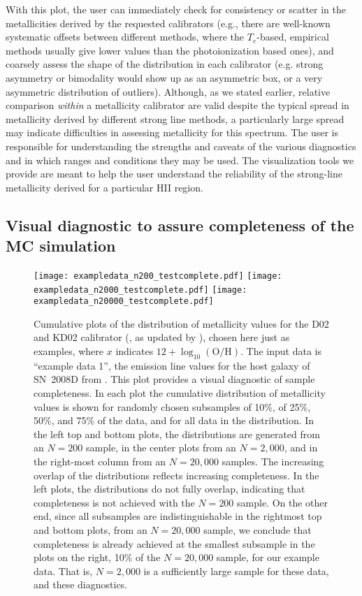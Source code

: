 \documentclass{emulateapj}
\newcommand{\oxabinline}{\ensuremath{12 + \log_{10}(\mathrm{O}/\mathrm{H})}}
\begin{document}
With this plot, the user can immediately check for consistency or
scatter in the metallicities derived by the requested calibrators
(e.g., there are well-known systematic offsets between different
methods, where the $T_e$-based, empirical methods usually give lower
values than the photoionization based ones), and coarsely assess the
shape of the distribution in each calibrator (e.g. strong asymmetry or
bimodality would show up as an asymmetric box, or a very asymmetric
distribution of outliers). Although, as we stated earlier, relative
comparison \emph{within} a metallicity calibrator are valid despite
the typical spread in metallicity derived by different strong line
methods, a particularly large spread may indicate difficulties in
assessing metallicity for this spectrum. The user is responsible for
understanding the strengths and caveats of the various diagnostics and
in which ranges and conditions they may be used. The visualization
tools we provide are meant to help the user understand the reliability
of the strong-line metallicity derived for a particular HII region.


\subsection{Visual diagnostic to assure completeness of the MC simulation}\label{sec:completeness}

\begin{figure*}[!ht]
\centerline{
  \texttt{[image: exampledata\_n200\_testcomplete.pdf]}
  \texttt{[image: exampledata\_n2000\_testcomplete.pdf]}
  \texttt{[image: exampledata\_n20000\_testcomplete.pdf]}}
\caption{Cumulative plots of the distribution of metallicity values
  for the D02 \citep{denicolo02} and KD02 calibrator
  (\citealt{kewley02}, as updated by \citealt{kewley08}), chosen here
  just as examples, where $x$ indicates \oxabinline. The input data is
  ``example data 1'', the emission line values for the host galaxy of
  SN~2008D from \citet{modjaz11}. This plot provides a visual
  diagnostic of sample completeness. In each plot the cumulative
  distribution of metallicity values is shown for randomly chosen
  subsamples of 10\%, of 25\%, 50\%, and 75\% of the data, and for all
  data in the distribution. In the left top and bottom plots, the
  distributions are generated from an $N=200$ sample, in the center
  plots from an $N=2,000$, and in the right-most column from an
  $N=20,000$ samples. The increasing overlap of the distributions
  reflects increasing completeness. In the left plots, the
  distributions do not fully overlap, indicating that completeness is
  not achieved with the $N=200$ sample. On the other end, since all
  subsamples are indistinguishable in the rightmost top and bottom
  plots, from an $N=20,000$ sample, we conclude that completeness is
  already achieved at the smallest subsample in the plots on the right,
  10\% of the $N=20,000$ sample, for our example data. That is,
  $N=2,000$ is a sufficiently large sample for these data, and these
  diagnostics.}
 \label{fig:cd}
\end{figure*}
\end{document}

